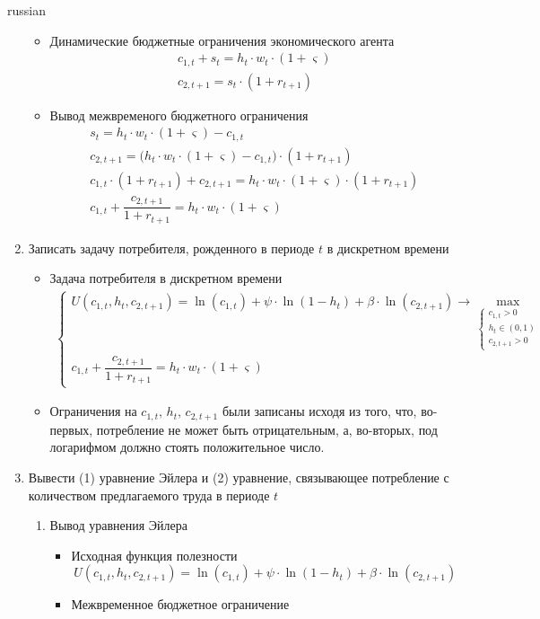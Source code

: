 \documentclass[fleqn]{article}
\begin{document}
\begin{otherlanguage*}{russian}
\begin{enumerate}[label=\alph*), leftmargin=*]
\begin{itemize}
\item Динамические бюджетные ограничения экономического агента 
\begin{align*}
c_{1, t} + s_t = h_t \cdot w_t \cdot (1 + \varsigma)  \\ 
c_{2, t+1} = s_t \cdot (1 + r_{t+1}) 
\end{align*}
\item Вывод межвременого бюджетного ограничения
\begin{align*}
s_t = h_t \cdot w_t \cdot (1 + \varsigma ) - c_{1, t} \\
c_{2, t+1} = \Big(h_t \cdot w_t \cdot (1 + \varsigma ) - c_{1, t}  \Big) \cdot (1 + r_{t+1}) \\
c_{1, t} \cdot (1 + r_{t+1}) + c_{2, t+1} = h_t \cdot w_t \cdot (1 + \varsigma) \cdot (1 + r_{t+1})  \\
c_{1,t} + \dfrac{c_{2,t+1}}{1 + r_{t+1}} = h_t \cdot w_t \cdot (1 + \varsigma) 
\end{align*}
\end{itemize}
\item Записать задачу потребителя, рожденного в периоде $ t $ в дискретном времени 
\begin{itemize}
\item Задача потребителя в дискретном времени 
\begin{align*}
\begin{cases} 
U(c_{1,t}, h_t, c_{2, t+1}) = \ln (c_{1, t}) + \psi \cdot \ln (1 - h_t) + \beta \cdot \ln (c_{2, t+1}) \rightarrow \max_{\begin{cases} c_{1, t} > 0 \\ h_t \in (0, 1) \\ c_{2, t+1} > 0 \end{cases}} \\
c_{1,t} + \dfrac{c_{2,t+1}}{1 + r_{t+1}} = h_t \cdot w_t \cdot (1 + \varsigma) 
\end{cases} 
\end{align*}
\item Ограничения на $ c_{1, t}, \, h_t, \, c_{2, t+1} $ были записаны исходя из того, что, во-первых, потребление не может быть отрицательным, а, во-вторых, под логарифмом должно стоять положительное число. 
\end{itemize}
\item Вывести (1) уравнение Эйлера и (2) уравнение, связывающее потребление с количеством предлагаемого труда в периоде $ t $ 
\begin{enumerate}[label=(\arabic*)]
\item Вывод уравнения Эйлера
\begin{itemize}
\item Исходная функция полезности 
$$ U(c_{1,t}, h_t, c_{2, t+1}) = \ln (c_{1, t}) + \psi \cdot \ln (1 - h_t) + \beta \cdot \ln (c_{2, t+1})  $$
\item Межвременное бюджетное ограничение 


\end{itemize}
\end{enumerate}
\end{enumerate}
\end{otherlanguage*}
\end{document}
